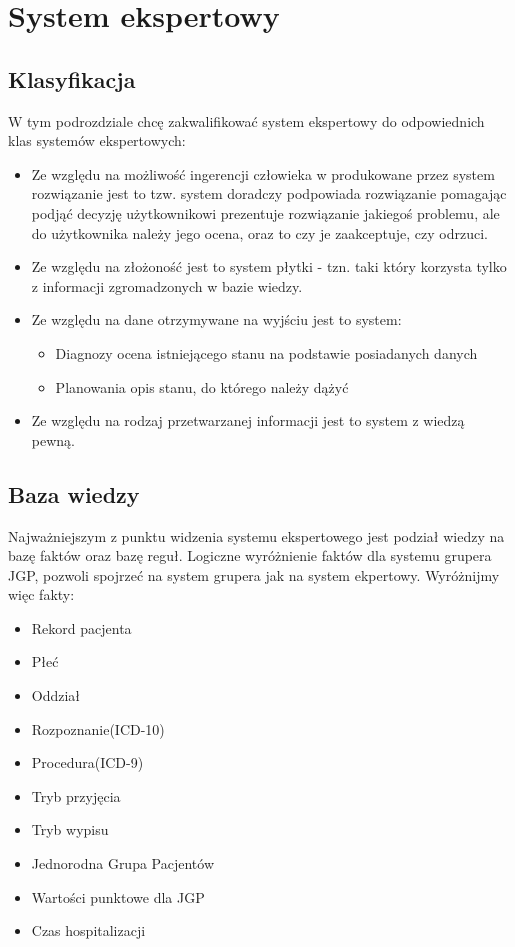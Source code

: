 \section{System ekspertowy}
\label{sec:systemEkspertowy}

\subsection{Klasyfikacja}
\label{sec:klasyfikacjaSystemuEkspertowego}
W tym podrozdziale chcę zakwalifikować system ekspertowy do odpowiednich klas systemów ekspertowych:
\begin{itemize}
 \item Ze względu na możliwość ingerencji człowieka w produkowane przez system rozwiązanie jest to tzw. system doradczy \textendash{} podpowiada rozwiązanie pomagając podjąć decyzję użytkownikowi \textendash{} prezentuje rozwiązanie jakiegoś problemu, ale do użytkownika należy jego ocena, oraz to czy je zaakceptuje, czy odrzuci.
 \item Ze względu na złożoność jest to system płytki - tzn. taki który korzysta tylko z informacji zgromadzonych w bazie wiedzy.
 \item Ze względu na dane otrzymywane na wyjściu jest to system:
   \begin{itemize}
    \item Diagnozy \textendash{} ocena istniejącego stanu na podstawie posiadanych danych
    \item Planowania \textendash{} opis stanu, do którego należy dążyć
   \end{itemize}
 \item Ze względu na rodzaj przetwarzanej informacji jest to system z wiedzą pewną.
\end{itemize}

\subsection{Baza wiedzy}
\label{sec:bazaWiedzy}
Najważniejszym z punktu widzenia systemu ekspertowego jest podział wiedzy na bazę faktów oraz bazę reguł. Logiczne wyróżnienie faktów dla systemu grupera JGP, pozwoli spojrzeć na system grupera jak na system ekpertowy. Wyróżnijmy więc fakty:
\begin{itemize}
 \item Rekord pacjenta
 \item Płeć
 \item Oddział
 \item Rozpoznanie(ICD-10)
 \item Procedura(ICD-9)
 \item Tryb przyjęcia
 \item Tryb wypisu
 \item Jednorodna Grupa Pacjentów
 \item Wartości punktowe dla JGP
 \item Czas hospitalizacji
\end{itemize}

